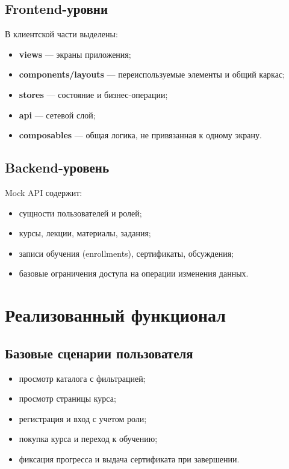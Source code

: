 \documentclass[a4paper,12pt]{article}
\begin{document}
\subsection{Frontend-уровни}
В клиентской части выделены:
\begin{itemize}
    \item \textbf{views} --- экраны приложения;
    \item \textbf{components/layouts} --- переиспользуемые элементы и общий каркас;
    \item \textbf{stores} --- состояние и бизнес-операции;
    \item \textbf{api} --- сетевой слой;
    \item \textbf{composables} --- общая логика, не привязанная к одному экрану.
\end{itemize}

\subsection{Backend-уровень}
Mock API содержит:
\begin{itemize}
    \item сущности пользователей и ролей;
    \item курсы, лекции, материалы, задания;
    \item записи обучения (enrollments), сертификаты, обсуждения;
    \item базовые ограничения доступа на операции изменения данных.
\end{itemize}

\section{Реализованный функционал}
\subsection{Базовые сценарии пользователя}
\begin{itemize}
    \item просмотр каталога с фильтрацией;
    \item просмотр страницы курса;
    \item регистрация и вход с учетом роли;
    \item покупка курса и переход к обучению;
    \item фиксация прогресса и выдача сертификата при завершении.
\end{itemize}
\end{document}
